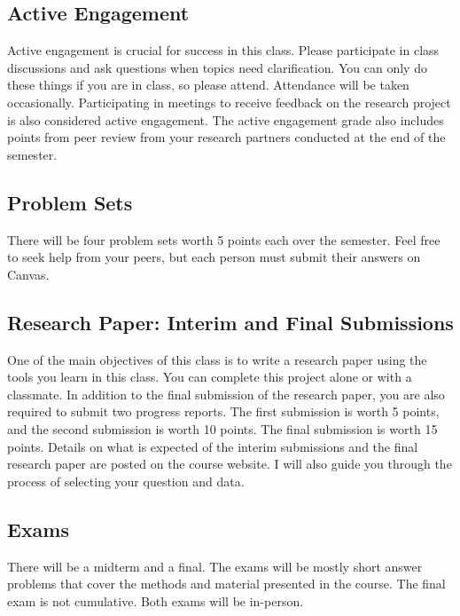 \documentclass{syllabus}
\begin{document}
\subsection*{Active Engagement}
Active engagement is crucial for success in this class. Please participate in class discussions and ask questions when topics need clarification. You can only do these things if you are in class, so please attend. Attendance will be taken occasionally. Participating in meetings to receive feedback on the research project is also considered active engagement. The active engagement grade also includes points from peer review from your research partners conducted at the end of the semester.

\subsection*{Problem Sets}
There will be four problem sets worth 5 points each over the semester. Feel free to seek help from your peers, but each person must submit their answers on Canvas.

\subsection*{Research Paper: Interim and Final Submissions}
One of the main objectives of this class is to write a research paper using the tools you learn in this class. You can complete this project alone or with a classmate. In addition to the final submission of the research paper, you are also required to submit two progress reports. The first submission is worth 5 points, and the second submission is worth 10 points. The final submission is worth 15 points. Details on what is expected of the interim submissions and the final research paper are posted on the course website. I will also guide you through the process of selecting your question and data.

\subsection*{Exams}
There will be a midterm and a final. The exams will be mostly short answer problems that cover the methods and material presented in the course. The final exam is not cumulative. Both exams will be in-person.

\end{document}
